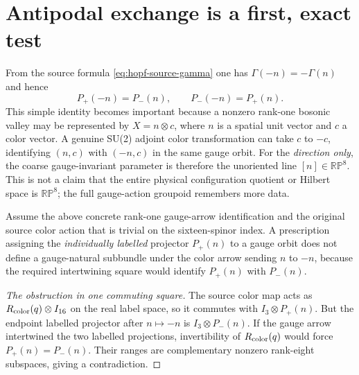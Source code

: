 \section{Antipodal exchange is a first, exact test}
From the source formula \eqref{eq:hopf-source-gamma} one has
$\Gamma(-n)=-\Gamma(n)$ and hence
\begin{equation}\label{eq:antipodal-exchange}
  P_+(-n)=P_-(n),\qquad P_-(-n)=P_+(n).
\end{equation}
This simple identity becomes important because a nonzero rank-one
bosonic valley may be represented by $X=n\otimes c$, where $n$ is
a spatial unit vector and $c$ a color vector. A genuine SU(2)
adjoint color transformation can take $c$ to $-c$, identifying
$(n,c)$ with $(-n,c)$ in the same gauge orbit. For the \emph{direction
only}, the coarse gauge-invariant parameter is therefore the
unoriented line $[n]\in\mathbb{RP}^8$. This is not a claim that the
entire physical configuration quotient or Hilbert space is
$\mathbb{RP}^8$; the full gauge-action groupoid remembers more data.

\begin{proposition}
\label{prop:hopf-naturality}
Assume the above concrete rank-one gauge-arrow identification and
the original source color action that is trivial on the sixteen-spinor
index. A prescription assigning the \emph{individually labelled}
projector $P_+(n)$ to a gauge orbit does not define a gauge-natural
subbundle under the color arrow sending $n$ to $-n$, because the
required intertwining square would identify $P_+(n)$ with
$P_-(n)$.
\end{proposition}
\begin{proof}[The obstruction in one commuting square]
The source color map acts as $R_{\rm color}(q)\otimes I_{16}$
on the real label space, so it commutes with $I_3\otimes P_+(n)$.
But the endpoint labelled projector after $n\mapsto-n$ is
$I_3\otimes P_-(n)$. If the gauge arrow intertwined the two
labelled projections, invertibility of $R_{\rm color}(q)$ would
force $P_+(n)=P_-(n)$. Their ranges are complementary nonzero
rank-eight subspaces, giving a contradiction.
\end{proof}


